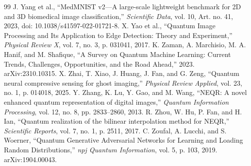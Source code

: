 \documentclass[11pt]{article}
\begin{document}
\begin{thebibliography}{99}
 J. Yang et al., ``MedMNIST v2---A large-scale lightweight benchmark for 2D and 3D biomedical image classification,'' \textit{Scientific Data}, vol. 10, Art. no. 41, 2023, doi: 10.1038/s41597-022-01721-8.
 X. Yao et al., ``Quantum Image Processing and Its Application to Edge Detection: Theory and Experiment,'' \textit{Physical Review X}, vol. 7, no. 3, p. 031041, 2017.
 K. Zaman, A. Marchisio, M. A. Hanif, and M. Shafique, ``A Survey on Quantum Machine Learning: Current Trends, Challenges, Opportunities, and the Road Ahead,'' 2023. arXiv:2310.10315.
 X. Zhai, T. Xiao, J. Huang, J. Fan, and G. Zeng, ``Quantum neural compressive sensing for ghost imaging,'' \textit{Physical Review Applied}, vol. 23, no. 1, p. 014018, 2025.
 Y. Zhang, K. Lu, Y. Gao, and M. Wang, ``NEQR: A novel enhanced quantum representation of digital images,'' \textit{Quantum Information Processing}, vol. 12, no. 8, pp. 2833--2860, 2013.
 R. Zhou, W. Hu, P. Fan, and H. Ian, ``Quantum realization of the bilinear interpolation method for NEQR,'' \textit{Scientific Reports}, vol. 7, no. 1, p. 2511, 2017.
 C. Zoufal, A. Lucchi, and S. Woerner, ``Quantum Generative Adversarial Networks for Learning and Loading Random Distributions,'' \textit{npj Quantum Information}, vol. 5, p. 103, 2019. arXiv:1904.00043.
\end{thebibliography}
\end{document}
